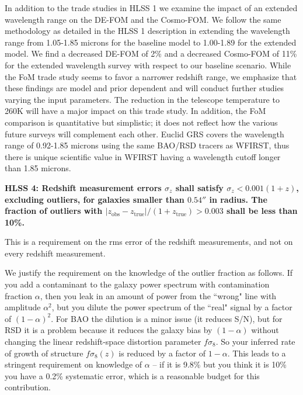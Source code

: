  In addition to the trade studies in HLSS 1 we examine the impact of an extended
 wavelength range on the DE-FOM and the Cosmo-FOM. We follow the same methodology
 as detailed in the HLSS 1 description in extending the wavelength range from
 1.05-1.85 microns for the baseline model to 1.00-1.89 for the extended model.
 We find a decreased DE-FOM of 2\% and a decreased
 Cosmo-FOM of 11\% for the extended wavelength survey with respect to our
 baseline scenario. While the FoM trade study seems to favor a narrower redshift
 range, we emphasize that these findings are model and prior dependent and will
 conduct further studies varying the input parameters. The reduction in the
 telescope temperature to 260K will have a major impact on this trade study. In
 addition, the FoM comparison is quantitative but simplistic; it does not reflect
 how the various future surveys will complement each other. Euclid GRS covers the
 wavelength range of 0.92-1.85 microns using the same BAO/RSD tracers as WFIRST,
 thus there is unique scientific value in WFIRST having a wavelength cutoff
 longer than 1.85 microns.


 \noindent
 {\bf HLSS 4: Redshift measurement errors $\sigma_z$ shall satisfy $\sigma_z <
 0.001(1+z)$, excluding outliers, for galaxies smaller than $0.54''$ in radius. The
 fraction of outliers with $|z_\mathrm{obs}-
 z_\mathrm{true}|/(1+z_\mathrm{true})>0.003$ shall be less than 10\%.}

 This is a requirement on the rms error of the redshift measurements, and not on
 every redshift measurement.

 We justify the requirement on the knowledge of the outlier fraction as follows.
 If you add a contaminant to the galaxy power spectrum with contamination
 fraction $\alpha$, then you leak in an amount of power from the ``wrong" line with
 amplitude $\alpha^2$, but you dilute the power spectrum of the ``real" signal by a factor
 of $(1-\alpha)^2$. For BAO the dilution is a minor issue (it reduces S/N), but for RSD
 it is a problem because it reduces the galaxy bias by $(1-\alpha)$ without changing the
 linear redshift-space distortion parameter $f\sigma_8$. So
 your inferred rate of growth of structure $f\sigma_8(z)$ is reduced by a factor
 of $1-\alpha$.  This leads to a stringent requirement on knowledge of $\alpha$ -- if it
 is 9.8\% but you think it is 10\% you have a 0.2\% systematic error, which is a
 reasonable budget for this contribution.

